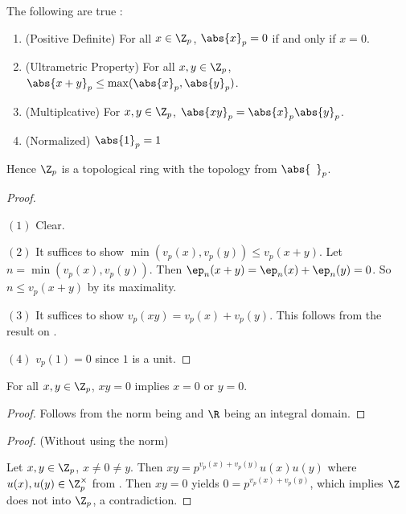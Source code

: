 \begin{prop}
  
  The following are true : 
  \begin{enumerate}
    \item (Positive Definite) 
    For all $x \in \Z_p$, $\abs{x}_p = 0$ if and only if $x = 0$. 
    \item (Ultrametric Property) 
    For all $x, y \in \Z_p$, 
    $\abs{x + y}_p \leq \max(\abs{x}_p,\abs{y}_p)$. 
    \item (Multiplcative)
    For $x, y \in \Z_p$, 
    $\abs{x y}_p = \abs{x}_p \abs{y}_p$. 
    \item (Normalized)
    $\abs{1}_p = 1$
  \end{enumerate}
  Hence $\Z_p$ is a topological ring with the topology from $\abs{\hspace{5pt}}_p$. 
\end{prop}
\begin{proof}~
  
  $(1)$ Clear. 

  $(2)$ It suffices to show $\min(v_p(x),v_p(y)) \leq v_p(x + y)$. 
  Let $n = \min(v_p(x),v_p(y))$. 
  Then $\ep_n(x + y) = \ep_n(x) + \ep_n(y) = 0$.
  So $n \leq v_p(x + y)$ by its maximality. 

  $(3)$ It suffices to show $v_p(x y) = v_p(x) + v_p(y)$. 
  This follows from the result on 
  .

  $(4)$ $v_p(1) = 0$ since $1$ is a unit. 
\end{proof}

\begin{prop}
  
  For all $x, y \in \Z_p$, $x y = 0$ implies $x = 0$ or $y = 0$. 
\end{prop}
\begin{proof}
  Follows from the norm being 
  and $\R$ being an integral domain. 
\end{proof}
\begin{proof}(Without using the norm)

  Let $x, y \in \Z_p$, $x \neq 0 \neq y$. 
  Then $x y = p^{v_p(x) + v_p(y)} u(x) u(y)$ 
  where $u(x), u(y) \in \Z_p^\times$ from 
  . 
  Then $x y = 0$ yields $0 = p^{v_p(x) + v_p(y)}$, 
  which implies $\Z$ does not  into $\Z_p$,
  a contradiction. 
\end{proof}


